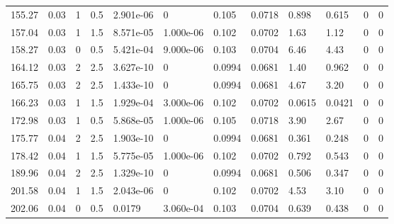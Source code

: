 \documentclass[preview]{standalone}
\begin{document}
{{\begin{tabular}{L{1.2cm}C{1.2cm} C{0.3cm}C{0.5cm} C{1.4cm}C{1.4cm} C{1.4cm}C{1.4cm} C{1.6cm}C{1.6cm} C{1.6cm}C{1.6cm}}
  155.27  &  0.03  & 1     & 0.5 &  2.901e-06  & 0  &  0.105&   0.0718& 0.898 & 0.615   &  0 & 0  \\ 
  157.04  &  0.03  & 1     & 1.5 &  8.571e-05  & 1.000e-06  &  0.102&   0.0702& 1.63 & 1.12   &  0 & 0  \\ 
  158.27  &  0.03  & 0     & 0.5 &  5.421e-04  & 9.000e-06  &  0.103&   0.0704& 6.46 & 4.43   &  0 & 0  \\ 
  164.12  &  0.03  & 2     & 2.5 &  3.627e-10  & 0  &  0.0994&   0.0681& 1.40 & 0.962   &  0 & 0  \\ 
  165.75  &  0.03  & 2     & 2.5 &  1.433e-10  & 0  &  0.0994&   0.0681& 4.67 & 3.20   &  0 & 0  \\ 
  166.23  &  0.03  & 1     & 1.5 &  1.929e-04  & 3.000e-06  &  0.102&   0.0702& 0.0615 & 0.0421   &  0 & 0  \\ 
  172.98  &  0.03  & 1     & 0.5 &  5.868e-05  & 1.000e-06  &  0.105&   0.0718& 3.90 & 2.67   &  0 & 0  \\ 
  175.77  &  0.04  & 2     & 2.5 &  1.903e-10  & 0  &  0.0994&   0.0681& 0.361 & 0.248   &  0 & 0  \\ 
  178.42  &  0.04  & 1     & 1.5 &  5.775e-05  & 1.000e-06  &  0.102&   0.0702& 0.792 & 0.543   &  0 & 0  \\ 
  189.96  &  0.04  & 2     & 2.5 &  1.329e-10  & 0  &  0.0994&   0.0681& 0.506 & 0.347   &  0 & 0  \\ 
  201.58  &  0.04  & 1     & 1.5 &  2.043e-06  & 0  &  0.102&   0.0702& 4.53 & 3.10   &  0 & 0  \\ 
  202.06  &  0.04  & 0     & 0.5 &  0.0179  & 3.060e-04  &  0.103&   0.0704& 0.639 & 0.438   &  0 & 0  \\ 
\hline 
\end{tabular} 

}}
\end{document}

